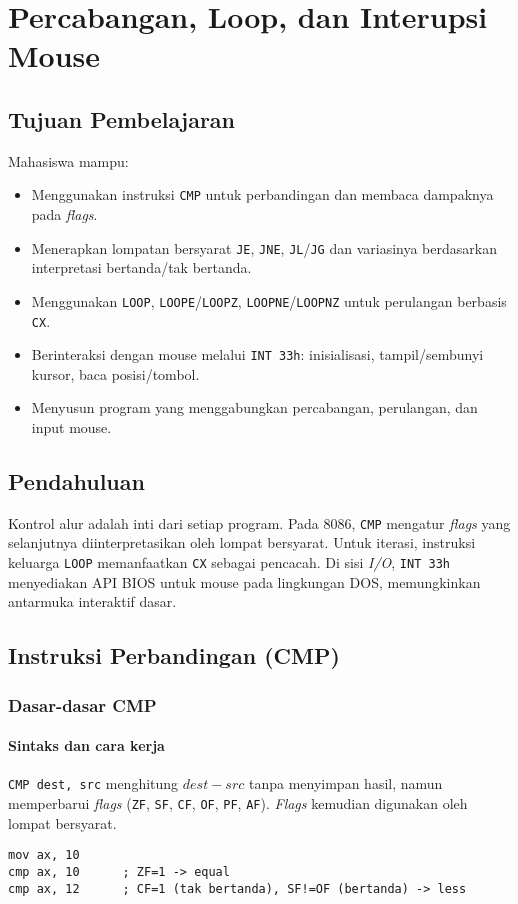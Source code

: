 \chapter{Percabangan, Loop, dan Interupsi Mouse}

\section{Tujuan Pembelajaran}
Mahasiswa mampu:
\begin{itemize}
    \item Menggunakan instruksi \texttt{CMP} untuk perbandingan dan membaca dampaknya pada \textit{flags}.
    \item Menerapkan lompatan bersyarat \texttt{JE}, \texttt{JNE}, \texttt{JL}/\texttt{JG} dan variasinya berdasarkan interpretasi bertanda/tak bertanda.
    \item Menggunakan \texttt{LOOP}, \texttt{LOOPE}/\texttt{LOOPZ}, \texttt{LOOPNE}/\texttt{LOOPNZ} untuk perulangan berbasis \texttt{CX}.
    \item Berinteraksi dengan mouse melalui \texttt{INT 33h}: inisialisasi, tampil/sembunyi kursor, baca posisi/tombol.
    \item Menyusun program yang menggabungkan percabangan, perulangan, dan input mouse.
\end{itemize}

\section{Pendahuluan}
Kontrol alur adalah inti dari setiap program. Pada 8086, \texttt{CMP} mengatur \textit{flags} yang selanjutnya diinterpretasikan oleh lompat bersyarat. Untuk iterasi, instruksi keluarga \texttt{LOOP} memanfaatkan \texttt{CX} sebagai pencacah. Di sisi \textit{I/O}, \texttt{INT 33h} menyediakan API BIOS untuk mouse pada lingkungan DOS, memungkinkan antarmuka interaktif dasar.

\section{Instruksi Perbandingan (CMP)}
\subsection{Dasar-dasar CMP}
\subsubsection{Sintaks dan cara kerja}
\texttt{CMP dest, src} menghitung \(dest - src\) tanpa menyimpan hasil, namun memperbarui \textit{flags} (\texttt{ZF}, \texttt{SF}, \texttt{CF}, \texttt{OF}, \texttt{PF}, \texttt{AF}). \textit{Flags} kemudian digunakan oleh lompat bersyarat.
\begin{verbatim}
mov ax, 10
cmp ax, 10      ; ZF=1 -> equal
cmp ax, 12      ; CF=1 (tak bertanda), SF!=OF (bertanda) -> less
\end{verbatim}

